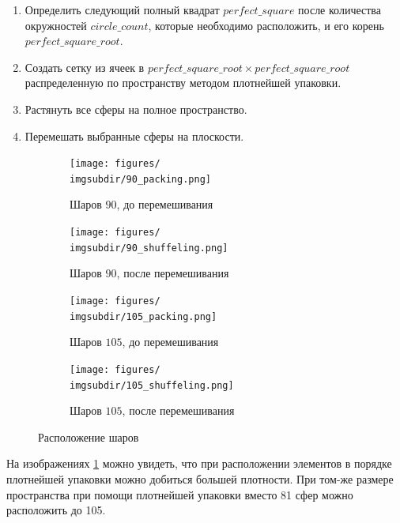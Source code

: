 \begin{enumerate}
\begin{enumerate}[label=\arabic*)]
        \item 
        Определить следующий полный квадрат $perfect\_square$ после количества окружностей $circle\_count$, которые необходимо расположить, и его корень \newline $perfect\_square\_root$.
        \item 
        Создать сетку из ячеек в $perfect\_square\_root \times perfect\_square\_root$ распределенную по пространству методом плотнейшей упаковки.
        \item
        Растянуть все сферы на полное пространство.
        \item
        Перемешать выбранные сферы на плоскости.
    \end{enumerate}
    
    \renewcommand{\imgsize}{8cm}
    \newcommand{\imgsubdir}{tight_packing}
    \begin{figure}[h!]
        \begin{subfigure}{0.49\textwidth}
            \centering
            \texttt{[image: figures/\\imgsubdir/90\_packing.png]}
            \caption{Шаров $90$, до перемешивания}
        \end{subfigure}
        \begin{subfigure}{0.49\textwidth}
            \centering
            \texttt{[image: figures/\\imgsubdir/90\_shuffeling.png]}
            \caption{Шаров $90$, после перемешивания}
        \end{subfigure}
        \begin{subfigure}{0.49\textwidth}
            \centering
            \texttt{[image: figures/\\imgsubdir/105\_packing.png]}
            \caption{Шаров $105$, до перемешивания}
        \end{subfigure}
        \begin{subfigure}{0.49\textwidth}
            \centering
            \texttt{[image: figures/\\imgsubdir/105\_shuffeling.png]}
            \caption{Шаров $105$, после перемешивания}
        \end{subfigure}
        \caption{Расположение шаров}
        \label{fig:tight_packing}
    \end{figure}
    На изображениях \ref{fig:tight_packing} можно увидеть, что при расположении элементов в порядке плотнейшей упаковки можно добиться большей плотности. При том-же размере пространства при помощи плотнейшей упаковки вместо 81 сфер можно расположить до 105. 

\end{enumerate}

